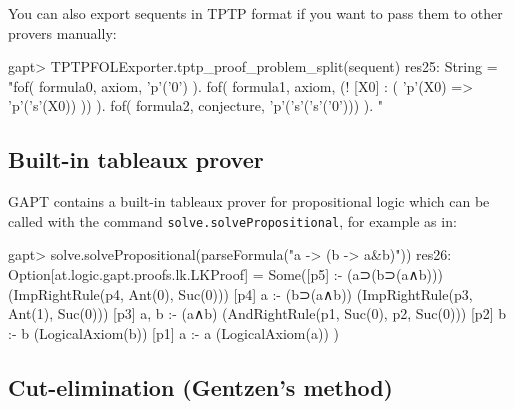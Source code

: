 \documentclass[a4paper,11pt]{article}
\begin{document}
You can also export sequents in TPTP format if you want to pass them to other
provers manually:
\begin{clilisting}
gapt> TPTPFOLExporter.tptp_proof_problem_split(sequent)
res25: String =
"fof( formula0, axiom, 'p'('0') ).
fof( formula1, axiom, (! [X0] : ( 'p'(X0) => 'p'('s'(X0)) )) ).
fof( formula2, conjecture, 'p'('s'('s'('0'))) ).
"

\end{clilisting}

\subsection{Built-in tableaux prover}

GAPT contains a  built-in tableaux prover for propositional logic
which can be called with the command \texttt{solve.solvePropositional}, for example as in:
\begin{clilisting}
gapt> solve.solvePropositional(parseFormula("a -> (b -> a&b)"))
res26: Option[at.logic.gapt.proofs.lk.LKProof] =
Some([p5]  :- (a⊃(b⊃(a∧b)))    (ImpRightRule(p4, Ant(0), Suc(0)))
[p4] a :- (b⊃(a∧b))    (ImpRightRule(p3, Ant(1), Suc(0)))
[p3] a, b :- (a∧b)    (AndRightRule(p1, Suc(0), p2, Suc(0)))
[p2] b :- b    (LogicalAxiom(b))
[p1] a :- a    (LogicalAxiom(a))
)

\end{clilisting}


\subsection{Cut-elimination (Gentzen's method)}
\end{document}
